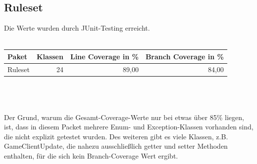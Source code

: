 \documentclass[a4paper]{article}
\begin{document}
 	
	\subsection{Ruleset}
	
Die Werte wurden durch JUnit-Testing erreicht.
 \ \\ \ \\ 	
	\noindent
	\begin{tabular}{|l|r|r|r|} \hline
	Paket & Klassen & Line Coverage in \% & Branch Coverage in \% \\ \hline \hline
Ruleset & \multicolumn{1}{r|}{24} & \multicolumn{1}{r|}{89,00} & \multicolumn{1}{r|}{84,00} \\ \hline
\end{tabular}
 \ \\ \ \\ \ \\
Der Grund, warum die Gesamt-Coverage-Werte nur bei etwas über 85\% liegen, ist, dass in diesem Packet mehrere Enum- und Exception-Klassen vorhanden sind, die nicht explizit getestet wurden. Des weiteren gibt es viele Klassen, z.B. GameClientUpdate,   die nahezu ausschließlich getter und setter Methoden enthalten, für die sich kein Branch-Coverage Wert ergibt. \\
\ \\
\noindent
\end{document}
